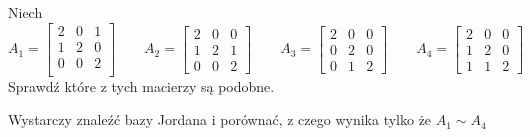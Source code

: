 \documentclass[11pt]{scrartcl}
\begin{document}
      
      \begin{zadanie}
          Niech
          \[
              A_{1} = 
              \begin{bmatrix}
                2 & 0 & 1 \\
                1 & 2 & 0 \\
                0 & 0 & 2 \\
              \end{bmatrix}
              \qquad 
              A_{2} = 
              \begin{bmatrix}
                2 & 0 & 0 \\
                1 & 2 & 1 \\
                0 & 0 & 2
              \end{bmatrix}
              \qquad 
              A_{3} = 
              \begin{bmatrix}
                2 & 0 & 0 \\
                0 & 2 & 0 \\
                0 & 1 & 2
              \end{bmatrix}
              \qquad 
              A_4 = 
              \begin{bmatrix}
                2 & 0 & 0 \\
                1 & 2 & 0 \\
                1 & 1 & 2
              \end{bmatrix}
          \]
          Sprawdź które z tych macierzy są podobne. 
      \end{zadanie}

      Wystarczy znaleźć bazy Jordana i porównać, z czego wynika tylko że $A_1 \sim A_4$
      
\end{document}
